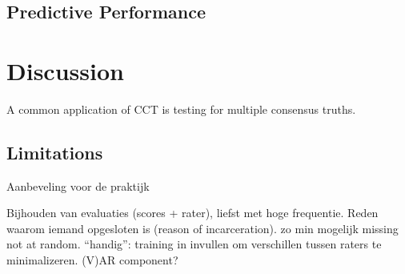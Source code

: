 \documentclass{article}
\begin{document}
\subsection*{Predictive Performance}

\section*{Discussion}


A common application of CCT is testing for multiple consensus truths.

\subsection*{Limitations}

Aanbeveling voor de praktijk

Bijhouden van evaluaties (scores + rater), liefst met hoge frequentie. 
Reden waarom iemand opgesloten is (reason of incarceration).
zo min mogelijk missing not at random.
``handig'': training in invullen om verschillen tussen raters te minimalizeren.
(V)AR component?



\end{document}
